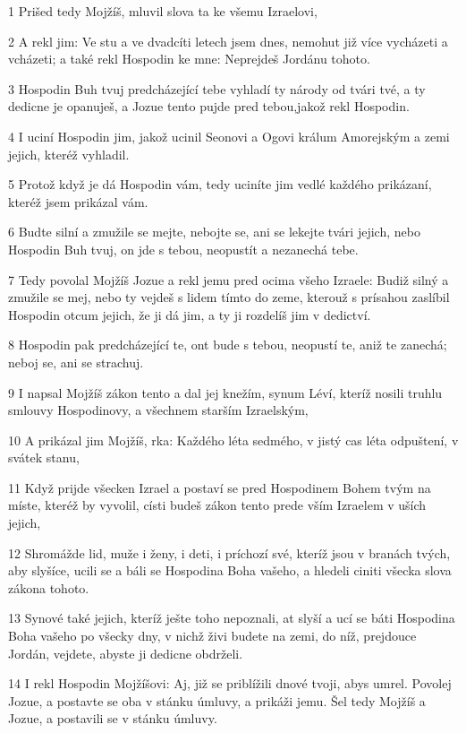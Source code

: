 \par 1 Prišed tedy Mojžíš, mluvil slova ta ke všemu Izraelovi,
\par 2 A rekl jim: Ve stu a ve dvadcíti letech jsem dnes, nemohut již více vycházeti a vcházeti; a také rekl Hospodin ke mne: Neprejdeš Jordánu tohoto.
\par 3 Hospodin Buh tvuj predcházející tebe vyhladí ty národy od tvári tvé, a ty dedicne je opanuješ, a Jozue tento pujde pred tebou,jakož rekl Hospodin.
\par 4 I uciní Hospodin jim, jakož ucinil Seonovi a Ogovi králum Amorejským a zemi jejich, kteréž vyhladil.
\par 5 Protož když je dá Hospodin vám, tedy uciníte jim vedlé každého prikázaní, kteréž jsem prikázal vám.
\par 6 Budte silní a zmužile se mejte, nebojte se, ani se lekejte tvári jejich, nebo Hospodin Buh tvuj, on jde s tebou, neopustít a nezanechá tebe.
\par 7 Tedy povolal Mojžíš Jozue a rekl jemu pred ocima všeho Izraele: Budiž silný a zmužile se mej, nebo ty vejdeš s lidem tímto do zeme, kterouž s prísahou zaslíbil Hospodin otcum jejich, že ji dá jim, a ty ji rozdelíš jim v dedictví.
\par 8 Hospodin pak predcházející te, ont bude s tebou, neopustí te, aniž te zanechá; neboj se, ani se strachuj.
\par 9 I napsal Mojžíš zákon tento a dal jej knežím, synum Léví, kteríž nosili truhlu smlouvy Hospodinovy, a všechnem starším Izraelským,
\par 10 A prikázal jim Mojžíš, rka: Každého léta sedmého, v jistý cas léta odpuštení, v svátek stanu,
\par 11 Když prijde všecken Izrael a postaví se pred Hospodinem Bohem tvým na míste, kteréž by vyvolil, císti budeš zákon tento prede vším Izraelem v uších jejich,
\par 12 Shromážde lid, muže i ženy, i deti, i príchozí své, kteríž jsou v branách tvých, aby slyšíce, ucili se a báli se Hospodina Boha vašeho, a hledeli ciniti všecka slova zákona tohoto.
\par 13 Synové také jejich, kteríž ješte toho nepoznali, at slyší a ucí se báti Hospodina Boha vašeho po všecky dny, v nichž živi budete na zemi, do níž, prejdouce Jordán, vejdete, abyste ji dedicne obdrželi.
\par 14 I rekl Hospodin Mojžíšovi: Aj, již se priblížili dnové tvoji, abys umrel. Povolej Jozue, a postavte se oba v stánku úmluvy, a prikáži jemu. Šel tedy Mojžíš a Jozue, a postavili se v stánku úmluvy.
